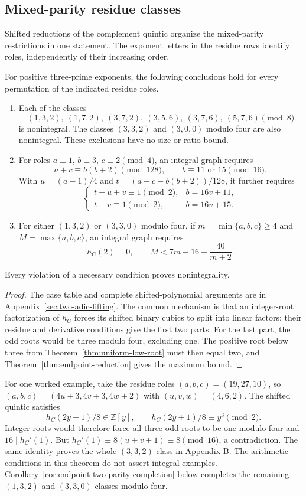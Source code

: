 \subsection{Mixed-parity residue classes}
\label{sec:mixed-parity-congruence}

Shifted reductions of the complement quintic organize the mixed-parity
restrictions in one statement. The exponent letters in the residue rows
identify roles, independently of their increasing order.

\begin{theorem}
\label{thm:mixed-residue-classes}
For positive three-prime exponents, the following conclusions hold for
every permutation of the indicated residue roles.
\begin{enumerate}
\item Each of the classes
\[
 (1,3,2),\ (1,7,2),\ (3,7,2),\ (3,5,6),\ (3,7,6),\ (5,7,6)\pmod8
\]
is nonintegral. The classes $(3,3,2)$ and $(3,0,0)$ modulo four are
also nonintegral. These exclusions have no size or ratio bound.
\item For roles $a\equiv1$, $b\equiv3$, $c\equiv2\pmod4$, an integral
graph requires
\[
 a+c\equiv b(b+2)\pmod{128},\qquad b\equiv11\text{ or }15\pmod{16}.
\]
With $u=(a-1)/4$ and $t=(a+c-b(b+2))/128$, it further requires
\[
 \begin{cases}
 t+u+v\equiv1\pmod2,&b=16v+11,\\
 t+v\equiv1\pmod2,&b=16v+15.
 \end{cases}
\]
\item For either $(1,3,2)$ or $(3,3,0)$ modulo four, if
$m=\min\{a,b,c\}\geq4$ and $M=\max\{a,b,c\}$, an integral graph requires
\[
 h_C(2)=0,\qquad M<7m-16+\frac{40}{m+2}.
\]
\end{enumerate}
Every violation of a necessary condition proves nonintegrality.
\end{theorem}

\begin{proof}
The case table and complete shifted-polynomial arguments are in
Appendix~\ref{sec:two-adic-lifting}. The common mechanism is that an
integer-root factorization of $h_C$ forces its shifted binary cubics to
split into linear factors; their residue and derivative conditions give
the first two parts. For the last part, the odd roots would be three
modulo four, excluding one. The positive root below three from
Theorem~\ref{thm:uniform-low-root} must then equal two, and
Theorem~\ref{thm:endpoint-reduction} gives the maximum bound.
\end{proof}

For one worked example, take the residue roles $(a,b,c)=(19,27,10)$,
so $(a,b,c)=(4u+3,4v+3,4w+2)$ with $(u,v,w)=(4,6,2)$.
The shifted quintic satisfies
\[
 h_C(2y+1)/8\in\mathbb Z[y],\qquad h_C(2y+1)/8\equiv y^3\pmod2.
\]
Integer roots would therefore force all three odd roots to be one modulo
four and $16\mid h_C'(1)$. But
$h_C'(1)\equiv8(u+v+1)\equiv8\pmod{16}$, a contradiction.
The same identity proves the whole $(3,3,2)$ class in Appendix B.
The arithmetic conditions in this theorem do not assert integral examples.
Corollary~\ref{cor:endpoint-two-parity-completion} below completes the
remaining $(1,3,2)$ and $(3,3,0)$ classes modulo four.
